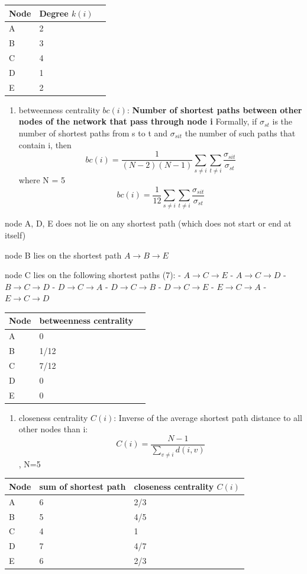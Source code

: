 \documentclass[11pt]{article}
\providecommand{\tightlist}{%
      \setlength{\itemsep}{0pt}\setlength{\parskip}{0pt}}
\begin{document}
\begin{longtable}[]{@{}lll@{}}
\toprule
Node & Degree \(k(i)\)\tabularnewline
\midrule
\endhead
A & 2\tabularnewline
B & 3\tabularnewline
C & 4\tabularnewline
D & 1\tabularnewline
E & 2\tabularnewline
\bottomrule
\end{longtable}

    \begin{enumerate}
\def\labelenumi{\arabic{enumi}.}
\setcounter{enumi}{1}
\tightlist
\item
  betweenness centrality \(bc(i)\): \textbf{Number of shortest paths
  between other nodes of the network that pass through node i} Formally,
  if \(\sigma_{st}\) is the number of shortest paths from s to t and
  \(\sigma_{sit}\) the number of such paths that contain i, then
  \[bc(i) = \frac{1}{(N-2)(N-1)} \sum_{s \neq i} \sum_{t \neq i} \frac{\sigma_{sit}}{\sigma_{st}}\]
  where N = 5
  \[bc(i) = \frac{1}{12} \sum_{s \neq i} \sum_{t \neq i} \frac{\sigma_{sit}}{\sigma_{st}}\]
\end{enumerate}

node A, D, E does not lie on any shortest path (which does not start or
end at itself)

node B lies on the shortest path \(A \rightarrow B \rightarrow E\)

node C lies on the following shortest paths (7): -
\(A \rightarrow C \rightarrow E\) - \(A \rightarrow C \rightarrow D\) -
\(B \rightarrow C \rightarrow D\) - \(D \rightarrow C \rightarrow A\) -
\(D \rightarrow C \rightarrow B\) - \(D \rightarrow C \rightarrow E\) -
\(E \rightarrow C \rightarrow A\) - \(E \rightarrow C \rightarrow D\)

\begin{longtable}[]{@{}lll@{}}
\toprule
Node & betweenness centrality\tabularnewline
\midrule
\endhead
A & 0\tabularnewline
B & 1/12\tabularnewline
C & 7/12\tabularnewline
D & 0\tabularnewline
E & 0\tabularnewline
\bottomrule
\end{longtable}

    \begin{enumerate}
\def\labelenumi{\arabic{enumi}.}
\setcounter{enumi}{2}
\tightlist
\item
  closeness centrality \(C(i)\): Inverse of the average shortest path
  distance to all other nodes than i:
  \[C(i) = \frac{N-1}{\sum_{v \neq i} d(i, v)}\], N=5
\end{enumerate}

\begin{longtable}[]{@{}lll@{}}
\toprule
Node & sum of shortest path & closeness centrality
\(C(i)\)\tabularnewline
\midrule
\endhead
A & 6 & 2/3\tabularnewline
B & 5 & 4/5\tabularnewline
C & 4 & 1\tabularnewline
D & 7 & 4/7\tabularnewline
E & 6 & 2/3\tabularnewline
\bottomrule
\end{longtable}
\end{document}
